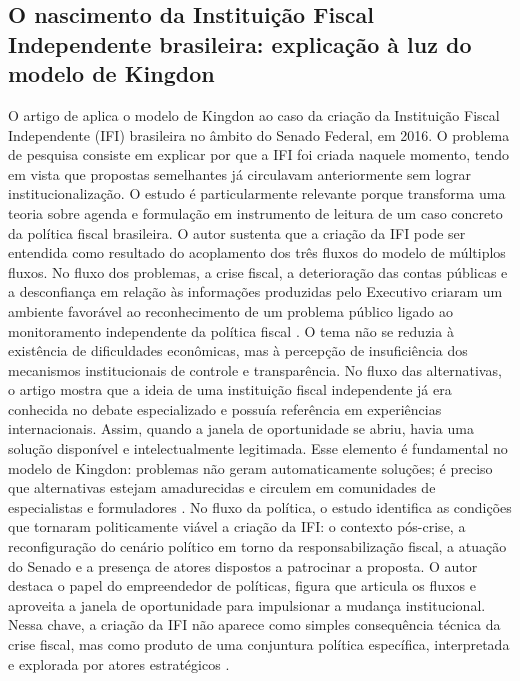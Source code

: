 \documentclass[12pt,a4paper]{article}
\begin{document}
\subsection{O nascimento da Instituição Fiscal Independente brasileira: explicação à luz do modelo de Kingdon}
\label{sec:orge5a18cc}
O artigo de \textcite{bijos2024ifi} aplica o modelo de Kingdon ao caso da criação da Instituição Fiscal Independente (IFI) brasileira no âmbito do Senado Federal, em 2016. O problema de pesquisa consiste em explicar por que a IFI foi criada naquele momento, tendo em vista que propostas semelhantes já circulavam anteriormente sem lograr institucionalização. O estudo é particularmente relevante porque transforma uma teoria sobre agenda e formulação em instrumento de leitura de um caso concreto da política fiscal brasileira.
O autor sustenta que a criação da IFI pode ser entendida como resultado do acoplamento dos três fluxos do modelo de múltiplos fluxos. No fluxo dos problemas, a crise fiscal, a deterioração das contas públicas e a desconfiança em relação às informações produzidas pelo Executivo criaram um ambiente favorável ao reconhecimento de um problema público ligado ao monitoramento independente da política fiscal \autocite{bijos2024ifi}. O tema não se reduzia à existência de dificuldades econômicas, mas à percepção de insuficiência dos mecanismos institucionais de controle e transparência.
No fluxo das alternativas, o artigo mostra que a ideia de uma instituição fiscal independente já era conhecida no debate especializado e possuía referência em experiências internacionais. Assim, quando a janela de oportunidade se abriu, havia uma solução disponível e intelectualmente legitimada. Esse elemento é fundamental no modelo de Kingdon: problemas não geram automaticamente soluções; é preciso que alternativas estejam amadurecidas e circulem em comunidades de especialistas e formuladores \autocites{bijos2024ifi}{kingdon2003agendas}.
No fluxo da política, o estudo identifica as condições que tornaram politicamente viável a criação da IFI: o contexto pós-crise, a reconfiguração do cenário político em torno da responsabilização fiscal, a atuação do Senado e a presença de atores dispostos a patrocinar a proposta. O autor destaca o papel do empreendedor de políticas, figura que articula os fluxos e aproveita a janela de oportunidade para impulsionar a mudança institucional. Nessa chave, a criação da IFI não aparece como simples consequência técnica da crise fiscal, mas como produto de uma conjuntura política específica, interpretada e explorada por atores estratégicos \autocite{bijos2024ifi}.
\end{document}
